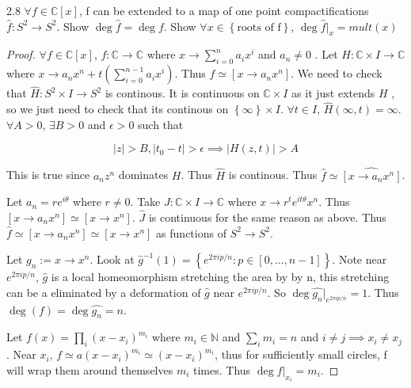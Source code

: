 \documentclass{article}
\newcommand{\C}{\mathbb{C}}
\newcommand{\N}{\mathbb{N}}
\newcommand{\abs}[1]{\left\lvert #1\right\rvert}
\begin{document}
\begin{PROB}{2.8}\label{Problem 2.8.}
    $\forall f \in \C[x]$, f can be extended to a map of one point compactifications $\hat{f} : S^2 \to S^2$. Show $\deg \hat{f} = \deg f$. Show $\forall x \in \left\{ \text{roots of f} \right\}$, $\deg \hat{f}|_{x} = mult(x)$ 
\end{PROB}
\begin{proof}
    $\forall f \in \C[x]$, $f: \C \to \C$ where $x \to \sum_{i = 0}^n a_i x^i$ and $a_n \neq 0$ . Let $H: \C \times I \to \C$ where $x \to a_n x^n + t\left(\sum_{i = 0}^{n- 1} a_i x^i\right)$. Thus $f \simeq [x \to a_n x^n]$. We need to check that $\hat{H}: S^2 \times I \to S^2$ is continous. It is continuous on $\C \times I$ as it just extends $H$ , so we just need to check that its continous on $\left\{ \infty \right\} \times I$. $\forall t \in I$, $\hat{H}(\infty, t) = \infty$. $\forall A > 0$, $\exists B > 0$ and $\epsilon > 0$ such that 
    
    \[\abs{z} > B, \abs{t_0 - t} > \epsilon \implies \abs{H(z, t)} > A\]

    This is true since $a_n z^n$ dominates $H$. Thus $\hat{H}$ is continous. Thus $\hat{f} \simeq \hat{[x \to a_n x^n]}$. 
    
    Let $a_n = r e^{i \theta}$ where $r \neq 0$.   
    Take $J : \C \times I \to \C$ where $x \to r^t e^{i t \theta} x^n$. Thus $[x \to a_n x^n] \simeq [x \to x^n]$. $\hat{J}$ is continuous for the same reason as above. Thus $\hat{f} \simeq [x \to a_n x^n] \simeq [x \to x^n]$ as functions of $S^2 \to S^2$. 
    
    Let $g_n := x \to x^n$. Look at $\hat{g}^{-1}(1) = \left\{ e^{2 \pi i p / n} : p \in [0, \dots, n - 1] \right\}$. Note near $e^{2 \pi i p / n}$, $\hat{g}$ is a local homeomorphism stretching the area by by n, this stretching can be a eliminated by a deformation of $\hat{g}$ near $e^{2 \pi i p / n}$. So $\deg{\hat{g_n}}|_{e^{2 \pi i p / n}} = 1$. Thus $\deg(f) = \deg{\hat{g_n}} = n$. 
    
    Let $f(x) = \prod_{i}(x - x_i)^{m_i}$ where $m_i \in \N$ and $\sum_{i} m_i = n$ and $i \neq j \implies x_i \neq x_j$ . Near $x_i$, $f \simeq a(x - x_i)^{m_i} \simeq (x - x_i)^{m_i}$, thus for sufficiently small circles, f will wrap them around themselves $m_i$ times. Thus $\deg f|_{x_i} = m_i$.            
\end{proof}

\bigskip
\end{document}
